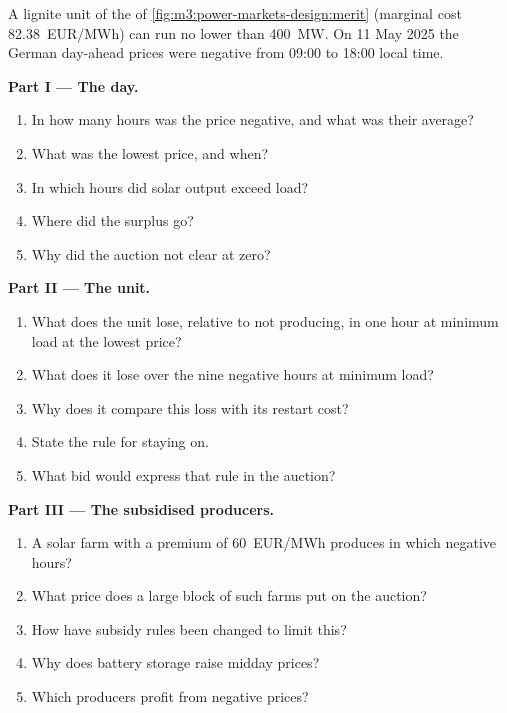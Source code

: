 \begin{problem}\label{pb:m3:power-markets-design:1}
A lignite unit of the  of \cref{fig:m3:power-markets-design:merit} (marginal
cost \qty{82.38}{EUR/MWh}) can run no lower than 400~MW. On 11 May 2025 the German
day-ahead prices were negative from 09:00 to 18:00 local time.

\medskip\noindent\textbf{Part I --- The day.}
\begin{enumerate}
\item In how many hours was the price negative, and what was their average?
\item What was the lowest price, and when?
\item In which hours did solar output exceed load?
\item Where did the surplus go?
\item Why did the auction not clear at zero?
\end{enumerate}

\medskip\noindent\textbf{Part II --- The unit.}
\begin{enumerate}[resume]
\item What does the unit lose, relative to not producing, in one hour at minimum load at the
lowest price?
\item What does it lose over the nine negative hours at minimum load?
\item Why does it compare this loss with its restart cost?
\item State the rule for staying on.
\item What bid would express that rule in the auction?
\end{enumerate}

\medskip\noindent\textbf{Part III --- The subsidised producers.}
\begin{enumerate}[resume]
\item A solar farm with a premium of \qty{60}{EUR/MWh} produces in which negative hours?
\item What price does a large block of such farms put on the auction?
\item How have subsidy rules been changed to limit this?
\item Why does battery storage raise midday prices?
\item Which producers profit from negative prices?
\end{enumerate}


\end{problem}

